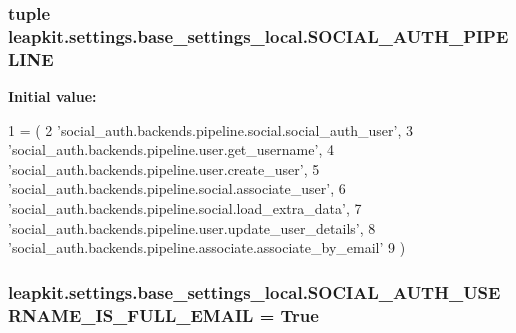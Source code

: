 \hypertarget{namespaceleapkit_1_1settings_1_1base__settings__local_a1ab02638cc743189114f5087ff441adb}{
\subsubsection[{S\-O\-C\-I\-A\-L\-\_\-\-A\-U\-T\-H\-\_\-\-P\-I\-P\-E\-L\-I\-N\-E}]{\setlength{\rightskip}{0pt plus 5cm}tuple leapkit.\-settings.\-base\-\_\-settings\-\_\-local.\-S\-O\-C\-I\-A\-L\-\_\-\-A\-U\-T\-H\-\_\-\-P\-I\-P\-E\-L\-I\-N\-E}}\label{namespaceleapkit_1_1settings_1_1base__settings__local_a1ab02638cc743189114f5087ff441adb}
{\bfseries Initial value\-:}
\begin{DoxyCode}
1 = (
2     \textcolor{stringliteral}{'social\_auth.backends.pipeline.social.social\_auth\_user'},
3     \textcolor{stringliteral}{'social\_auth.backends.pipeline.user.get\_username'},
4     \textcolor{stringliteral}{'social\_auth.backends.pipeline.user.create\_user'},
5     \textcolor{stringliteral}{'social\_auth.backends.pipeline.social.associate\_user'},
6     \textcolor{stringliteral}{'social\_auth.backends.pipeline.social.load\_extra\_data'},
7     \textcolor{stringliteral}{'social\_auth.backends.pipeline.user.update\_user\_details'},
8     \textcolor{stringliteral}{'social\_auth.backends.pipeline.associate.associate\_by\_email'}
9 )
\end{DoxyCode}
\hypertarget{namespaceleapkit_1_1settings_1_1base__settings__local_ad902dedf00dd609cfb9ebd4bfd077421}{
\subsubsection[{S\-O\-C\-I\-A\-L\-\_\-\-A\-U\-T\-H\-\_\-\-U\-S\-E\-R\-N\-A\-M\-E\-\_\-\-I\-S\-\_\-\-F\-U\-L\-L\-\_\-\-E\-M\-A\-I\-L}]{\setlength{\rightskip}{0pt plus 5cm}leapkit.\-settings.\-base\-\_\-settings\-\_\-local.\-S\-O\-C\-I\-A\-L\-\_\-\-A\-U\-T\-H\-\_\-\-U\-S\-E\-R\-N\-A\-M\-E\-\_\-\-I\-S\-\_\-\-F\-U\-L\-L\-\_\-\-E\-M\-A\-I\-L = True}}\label{namespaceleapkit_1_1settings_1_1base__settings__local_ad902dedf00dd609cfb9ebd4bfd077421}

